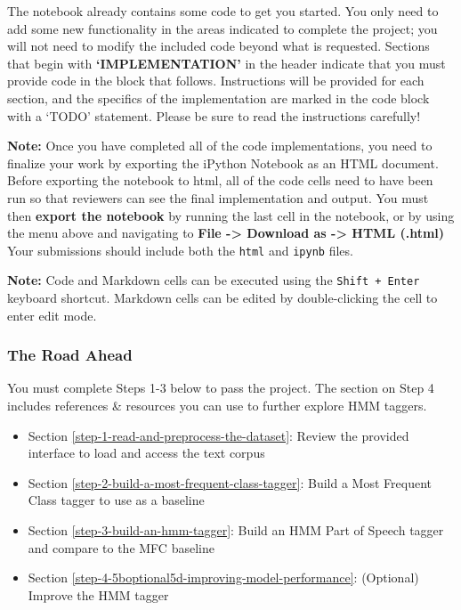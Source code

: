 \documentclass[11pt]{article}
\providecommand{\tightlist}{%
      \setlength{\itemsep}{0pt}\setlength{\parskip}{0pt}}
\begin{document}
The notebook already contains some code to get you started. You only
need to add some new functionality in the areas indicated to complete
the project; you will not need to modify the included code beyond what
is requested. Sections that begin with \textbf{`IMPLEMENTATION'} in the
header indicate that you must provide code in the block that follows.
Instructions will be provided for each section, and the specifics of the
implementation are marked in the code block with a `TODO' statement.
Please be sure to read the instructions carefully!

    \textbf{Note:} Once you have completed all of the code implementations,
you need to finalize your work by exporting the iPython Notebook as an
HTML document. Before exporting the notebook to html, all of the code
cells need to have been run so that reviewers can see the final
implementation and output. You must then \textbf{export the notebook} by
running the last cell in the notebook, or by using the menu above and
navigating to \textbf{File -\textgreater{} Download as -\textgreater{}
HTML (.html)} Your submissions should include both the \texttt{html} and
\texttt{ipynb} files.

    \textbf{Note:} Code and Markdown cells can be executed using the
\texttt{Shift\ +\ Enter} keyboard shortcut. Markdown cells can be edited
by double-clicking the cell to enter edit mode.

    \hypertarget{the-road-ahead}{%
\subsubsection{The Road Ahead}\label{the-road-ahead}}

You must complete Steps 1-3 below to pass the project. The section on
Step 4 includes references \& resources you can use to further explore
HMM taggers.

\begin{itemize}
\tightlist
\item
  Section \ref{step-1-read-and-preprocess-the-dataset}: Review the
  provided interface to load and access the text corpus
\item
  Section \ref{step-2-build-a-most-frequent-class-tagger}: Build a Most
  Frequent Class tagger to use as a baseline
\item
  Section \ref{step-3-build-an-hmm-tagger}: Build an HMM Part of Speech
  tagger and compare to the MFC baseline
\item
  Section \ref{step-4-5boptional5d-improving-model-performance}:
  (Optional) Improve the HMM tagger
\end{itemize}
\end{document}
